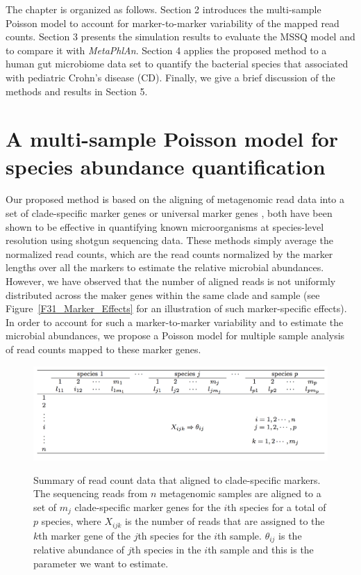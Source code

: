 The chapter is organized as follows. Section 2 introduces the multi-sample  Poisson model to account for marker-to-marker variability of the mapped read counts. Section 3 presents the simulation results to evaluate the MSSQ model and to compare it with {\it MetaPhlAn}. Section 4 applies the proposed method to a human gut microbiome data set to quantify the bacterial species  that associated with pediatric Crohn's disease (CD). Finally, we give a brief discussion of the methods and results in Section 5.


\section{A multi-sample Poisson model for species abundance quantification}


Our proposed method is based on the aligning of metagenomic read data into a set of clade-specific marker genes \citep{segata2012metagenomic} or universal marker genes \citep{Sunagawa:2013if}, both have been shown to be effective in quantifying known microorganisms at species-level resolution using shotgun sequencing data. These methods simply average the normalized read counts, which are the read counts normalized by the marker lengths over all the markers to estimate the relative microbial abundances. However, we have observed that the number of aligned reads is not uniformly distributed across the maker genes within the same clade and sample (see Figure~\ref{F31_Marker_Effects} for an illustration of such marker-specific effects). In order to account for such a marker-to-marker variability and to estimate the microbial abundances, we propose a Poisson model for multiple sample analysis of read counts mapped to these marker genes.

\begin{figure}[htb]
\centering
{\includegraphics[scale=0.5,trim=0 0 0 0,clip]{Figure/F32_table.pdf}}
\caption[Summary of read count data that aligned to clade-specific markers]{Summary of read count data that aligned to clade-specific markers. The sequencing reads from $n$ metagenomic samples are aligned to a set of $m_j$ clade-specific marker genes for the $i$th species  for a total of $p$ species, where $X_{ijk}$ is  the number of reads that are assigned to the $k$th marker gene of the $j$th species for the $i$th sample.  $\theta_{ij}$ is the relative abundance of $j$th species in the $i$th sample and this is the parameter we want to estimate.}
\label{F32_table}
\end{figure}



